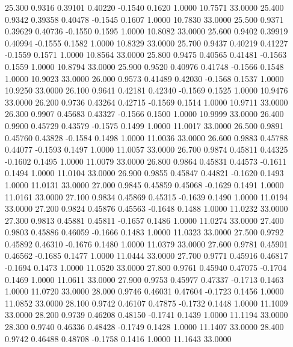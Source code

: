   25.300   0.9316   0.39101   0.40220  -0.1540   0.1620   1.0000  10.7571  33.0000
  25.400   0.9342   0.39358   0.40478  -0.1545   0.1607   1.0000  10.7830  33.0000
  25.500   0.9371   0.39629   0.40736  -0.1550   0.1595   1.0000  10.8082  33.0000
  25.600   0.9402   0.39919   0.40994  -0.1555   0.1582   1.0000  10.8329  33.0000
  25.700   0.9437   0.40219   0.41227  -0.1559   0.1571   1.0000  10.8564  33.0000
  25.800   0.9475   0.40565   0.41481  -0.1563   0.1559   1.0000  10.8794  33.0000
  25.900   0.9520   0.40976   0.41748  -0.1566   0.1548   1.0000  10.9023  33.0000
  26.000   0.9573   0.41489   0.42030  -0.1568   0.1537   1.0000  10.9250  33.0000
  26.100   0.9641   0.42181   0.42340  -0.1569   0.1525   1.0000  10.9476  33.0000
  26.200   0.9736   0.43264   0.42715  -0.1569   0.1514   1.0000  10.9711  33.0000
  26.300   0.9907   0.45683   0.43327  -0.1566   0.1500   1.0000  10.9999  33.0000
  26.400   0.9900   0.45729   0.43579  -0.1575   0.1499   1.0000  11.0017  33.0000
  26.500   0.9891   0.45760   0.43828  -0.1584   0.1498   1.0000  11.0036  33.0000
  26.600   0.9883   0.45788   0.44077  -0.1593   0.1497   1.0000  11.0057  33.0000
  26.700   0.9874   0.45811   0.44325  -0.1602   0.1495   1.0000  11.0079  33.0000
  26.800   0.9864   0.45831   0.44573  -0.1611   0.1494   1.0000  11.0104  33.0000
  26.900   0.9855   0.45847   0.44821  -0.1620   0.1493   1.0000  11.0131  33.0000
  27.000   0.9845   0.45859   0.45068  -0.1629   0.1491   1.0000  11.0161  33.0000
  27.100   0.9834   0.45869   0.45315  -0.1639   0.1490   1.0000  11.0194  33.0000
  27.200   0.9824   0.45876   0.45563  -0.1648   0.1488   1.0000  11.0232  33.0000
  27.300   0.9813   0.45881   0.45811  -0.1657   0.1486   1.0000  11.0274  33.0000
  27.400   0.9803   0.45886   0.46059  -0.1666   0.1483   1.0000  11.0323  33.0000
  27.500   0.9792   0.45892   0.46310  -0.1676   0.1480   1.0000  11.0379  33.0000
  27.600   0.9781   0.45901   0.46562  -0.1685   0.1477   1.0000  11.0444  33.0000
  27.700   0.9771   0.45916   0.46817  -0.1694   0.1473   1.0000  11.0520  33.0000
  27.800   0.9761   0.45940   0.47075  -0.1704   0.1469   1.0000  11.0611  33.0000
  27.900   0.9753   0.45977   0.47337  -0.1713   0.1463   1.0000  11.0720  33.0000
  28.000   0.9746   0.46031   0.47604  -0.1723   0.1456   1.0000  11.0852  33.0000
  28.100   0.9742   0.46107   0.47875  -0.1732   0.1448   1.0000  11.1009  33.0000
  28.200   0.9739   0.46208   0.48150  -0.1741   0.1439   1.0000  11.1194  33.0000
  28.300   0.9740   0.46336   0.48428  -0.1749   0.1428   1.0000  11.1407  33.0000
  28.400   0.9742   0.46488   0.48708  -0.1758   0.1416   1.0000  11.1643  33.0000
